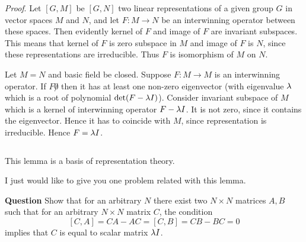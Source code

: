 {\sl Proof}.  Let $[G,M]$ be $[G,N]$ two 
 linear representations  of a given group $G$ in vector 
spaces $M$ and $N$, and let $F\colon M\to N$ be an 
interwinning operator between these spaces.
  Then evidently kernel of $F$ and image
of $F$ are invariant subspaces.  This means
that kernel of $F$ is zero subspace in $M$ and 
image of $F$ is $N$, since these representations are
irreducible. Thus  $F$ is isomorphism of $M$ on $N$.

  Let $M=N$ and basic field be closed. 
     Suppose $F\colon M\to M$ is an interwinning operator.
  If $F\not 0$ then
   it  has at least one non-zero eigenvector
(with eigenvalue $\lambda$ which is a root of polynomial 
$\det (F-\lambda I)$).    Consider invariant 
subspace of $M$ which is a kernel
of interwinning operator $F-\lambda I$. 
It is not zero, since it contains the eigenvector.
 Hence it has to coincide with $M$, since representation 
is irreducible. Hence $F=\lambda I$. 
   


   $$ $$

   This lemma is a basis of representation theory.

   I just would like to give you one problem related with this lemma.

   {\bf Question}  Show that for an arbitrary $N$ there exist
 two $N\times N$ matrices $A,B$ such that for an arbitrary
     $N\times N$ matrix $C$, the condition
             $$
 [C,A]=CA-AC=[C,B]=CB-BC=0
             $$ 
  implies that $C$ is equal to scalar matrix $\lambda I$.



\bye

